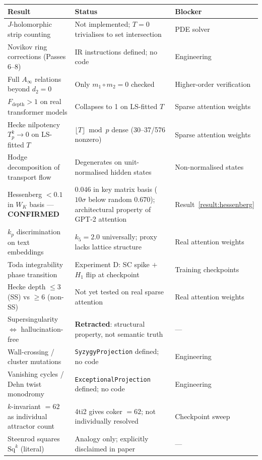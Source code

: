 \documentclass[11pt]{amsart}
\theoremstyle{definition}
\begin{document}
\begin{center}
\renewcommand{\arraystretch}{1.25}
\small
\begin{tabular}{@{}p{5.5cm}p{5.5cm}p{2.5cm}@{}}
\toprule
Result & Status & Blocker \\
\midrule
$J$-holomorphic strip counting &
  Not implemented; $T=0$ trivialises to set intersection &
  PDE solver \\
Novikov ring corrections (Passes 6--8) &
  IR instructions defined; no code &
  Engineering \\
Full $A_\infty$ relations beyond $d_2=0$ &
  Only $m_1\circ m_2=0$ checked &
  Higher-order verification \\
$F_\mathrm{depth}>1$ on real transformer models &
  Collapses to 1 on LS-fitted $T$ &
  Sparse attention weights \\
Hecke nilpotency $T_p^k\to 0$ on LS-fitted $T$ &
  $\lfloor T\rfloor\bmod p$ dense (30--37/576 nonzero) &
  Sparse attention weights \\
Hodge decomposition of transport flow &
  Degenerates on unit-normalised hidden states &
  Non-normalised states \\
Hessenberg $<0.1$ in $W_K$ basis — \textbf{CONFIRMED} &
  $0.046$ in key matrix basis ($10\sigma$ below random $0.670$);
  architectural property of GPT-2 attention &
  Result~\ref{result:hessenberg} \\
$k_p$ discrimination on text embeddings &
  $k_5=2.0$ universally; proxy lacks lattice structure &
  Real attention weights \\
Toda integrability phase transition &
  Experiment D: SC spike $+$ $H_1$ flip at checkpoint &
  Training checkpoints \\
Hecke depth $\leq3$ (SS) vs $\geq6$ (non-SS) &
  Not yet tested on real sparse attention &
  Real attention weights \\
Supersingularity $\iff$ hallucination-free &
  \textbf{Retracted}: structural property, not semantic truth &
  --- \\
Wall-crossing / cluster mutations &
  \texttt{SyzygyProjection} defined; no code &
  Engineering \\
Vanishing cycles / Dehn twist monodromy &
  \texttt{ExceptionalProjection} defined; no code &
  Engineering \\
$k$-invariant $=62$ as individual attractor count &
  4ti2 gives coker $=62$; not individually resolved &
  Checkpoint sweep \\
Steenrod squares $\mathrm{Sq}^k$ (literal) &
  Analogy only; explicitly disclaimed in paper &
  --- \\
\bottomrule
\end{tabular}
\end{center}
\end{document}
